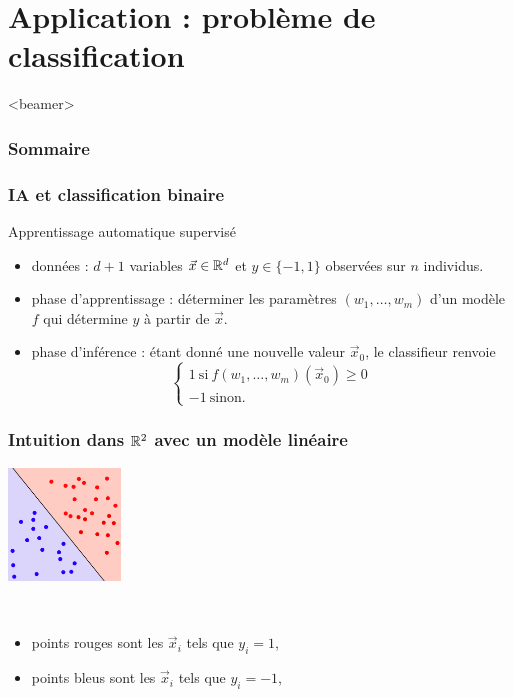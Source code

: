 \documentclass{beamer}
\newcommand{\R}{{\ensuremath\mathbb{R}}}
\begin{document}
\section{Application : problème de classification}

\begin{frame}<beamer>
  \frametitle{Sommaire}
  \tableofcontents[currentsection]
\end{frame}

\begin{frame}
  \frametitle{IA et classification binaire}

  \begin{block}{Apprentissage automatique supervisé}

    \begin{itemize}
      \item données : $d+1$ variables $\vec{x} \in \R^d$ et $y \in \{-1,1\}$ observées sur $n$ individus. 
      \item phase d'apprentissage : déterminer les paramètres $(w_1, \dots, w_m)$ d'un modèle $f$
        qui détermine $y$ à partir de $\vec{x}$.
      \item phase d'inférence : étant donné une nouvelle valeur $\vec{x}_0$,
        le classifieur renvoie
        \[
        \left\{
        \begin{array}{l} 1 \ \text{si} \ f(w_1, \dots, w_m)(\vec{x}_0) \geq 0 \\
          -1 \ \text{sinon}.
        \end{array}
        \right.
        \]
    \end{itemize}
    
  \end{block}

\end{frame}

\begin{frame}
  \frametitle{Intuition dans $\R^2$ avec un modèle linéaire}
  
  \centering
  \includegraphics[width=3cm]{linear-separation.png}

  ~
  
  \begin{itemize}
  \item points rouges sont les $\vec{x}_i$ tels que $y_i = 1$, 
  \item points bleus sont les $\vec{x}_i$ tels que $y_i = -1$, 
  \end{itemize}
  
\end{frame}
\end{document}
